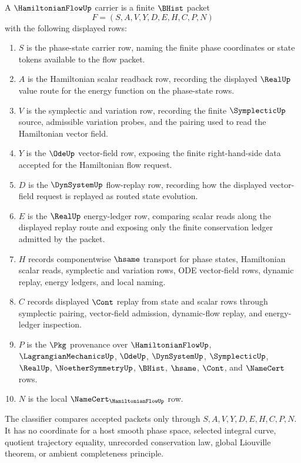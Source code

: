 \begin{definition}
\label{def:hamiltonian-flow-carrier}
A $\HamiltonianFlowUp$ carrier is a finite $\BHist$ packet
$$
F=(S,A,V,Y,D,E,H,C,P,N)
$$
with the following displayed rows:
\begin{enumerate}
\item $S$ is the phase-state carrier row, naming the finite phase coordinates or state tokens available to the flow packet.
\item $A$ is the Hamiltonian scalar readback row, recording the displayed $\RealUp$ value route for the energy function on the phase-state rows.
\item $V$ is the symplectic and variation row, recording the finite $\SymplecticUp$ source, admissible variation probes, and the pairing used to read the Hamiltonian vector field.
\item $Y$ is the $\OdeUp$ vector-field row, exposing the finite right-hand-side data accepted for the Hamiltonian flow request.
\item $D$ is the $\DynSystemUp$ flow-replay row, recording how the displayed vector-field request is replayed as routed state evolution.
\item $E$ is the $\RealUp$ energy-ledger row, comparing scalar reads along the displayed replay route and exposing only the finite conservation ledger admitted by the packet.
\item $H$ records componentwise $\hsame$ transport for phase states, Hamiltonian scalar reads, symplectic and variation rows, ODE vector-field rows, dynamic replay, energy ledgers, and local naming.
\item $C$ records displayed $\Cont$ replay from state and scalar rows through symplectic pairing, vector-field admission, dynamic-flow replay, and energy-ledger inspection.
\item $P$ is the $\Pkg$ provenance over $\HamiltonianFlowUp$, $\LagrangianMechanicsUp$, $\OdeUp$, $\DynSystemUp$, $\SymplecticUp$, $\RealUp$, $\NoetherSymmetryUp$, $\BHist$, $\hsame$, $\Cont$, and $\NameCert$ rows.
\item $N$ is the local $\NameCert_{\HamiltonianFlowUp}$ row.
\end{enumerate}
The classifier compares accepted packets only through $S,A,V,Y,D,E,H,C,P,N$. It has no coordinate for a host smooth phase space, selected integral curve, quotient trajectory equality, unrecorded conservation law, global Liouville theorem, or ambient completeness principle.
\end{definition}

